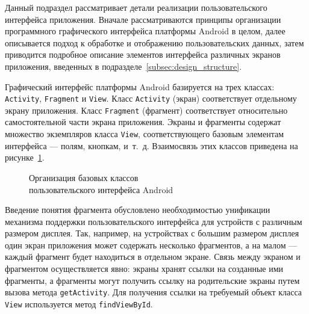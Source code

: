 Данный подраздел рассматривает детали реализации пользовательского
интерфейса приложения.
Вначале рассматриваются принципы организации программного
графического интерфейса платформы Android в целом,
далее описывается подход к обработке и отображению пользовательских данных,
затем приводится подробное описание элементов интерфейса различных
экранов приложения, введенных в подразделе~\ref{subsec:design_structure}.

Графический интерфейс платформы Android базируется на трех классах:
\texttt{Activity}, \texttt{Fragment} и \texttt{View}.
Класс \texttt{Activity} (экран) соответствует отдельному экрану приложения.
Класс \texttt{Fragment} (фрагмент) соответствует относительно самостоятельной части
экрана приложения.
Экраны и фрагменты содержат множество экземпляров класса \texttt{View},
соответствующего базовым элементам интерфейса --- полям, кнопкам, и~т.~д.
Взаимосвязь этих классов приведена на рисунке~\ref{fig:implementation_ui_hierarchy}.

\begin{figure}[h!]
  \centering
  \caption{Организация базовых классов \\ пользовательского интерфейса Android}
  \label{fig:implementation_ui_hierarchy}
\end{figure}

Введение понятия фрагмента обусловлено необходимостью унификации
механизма поддержки пользовательского интерфейса для устройств с различным
размером дисплея. Так, например, на устройствах с большим размером дисплея
один экран приложения может содержать несколько фрагментов, а на малом ---
каждый фрагмент будет находиться в отдельном экране.
Связь между экраном и фрагментом осуществляется явно:
экраны хранят ссылки на созданные ими фрагменты,
а фрагменты могут получить ссылку на родительские экраны путем
вызова метода \texttt{getActivity}.
Для получения ссылки на требуемый объект класса \texttt{View}
используется метод \texttt{findViewById}.

